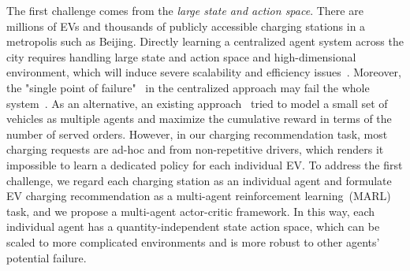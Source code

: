 \documentclass[sigconf]{acmart}
\begin{document}
The first challenge comes from the \emph{large state and action space}.
There are millions of EVs and thousands of publicly accessible charging stations in a metropolis such as Beijing. 
Directly learning a centralized agent system across the city requires handling large state and action space and high-dimensional environment, which will induce severe scalability and efficiency issues~\cite{papoudakis2019dealing,chu2019multi}.
Moreover, the "single point of failure"~\cite{lynch2009single} in the centralized approach may fail the whole system~\cite{li2019efficient}.
As an alternative, an existing approach~\citet{wang2020joint} tried to model a small set of vehicles as multiple agents and maximize the cumulative reward in terms of the number of served orders. 
However, in our charging recommendation task, most charging requests are ad-hoc and from non-repetitive drivers, which renders it impossible to learn a dedicated policy for each individual EV.
To address the first challenge, we regard each charging station as an individual agent and formulate EV charging recommendation as a multi-agent reinforcement learning~(MARL) task, and we propose a multi-agent actor-critic framework. In this way, each individual agent has a quantity-independent state action space, which can be scaled to more complicated environments and is more robust to other agents' potential failure.
\end{document}
